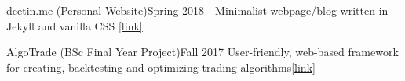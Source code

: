 \documentclass[main.tex]{subfiles}
\begin{document}
\olb


\olismall
{dcetin.me (Personal Website)}{Spring 2018 -}
{Minimalist webpage/blog written in Jekyll and vanilla CSS}
{\href{http://dcetin.me/}{[link]}}

\olismall
{AlgoTrade (BSc Final Year Project)}{Fall 2017}
{User-friendly, web-based framework for creating, backtesting and optimizing trading algorithms}{\href{https://senior.ceng.metu.edu.tr/2018/algotrading/}{[link]}}

\ole
\end{document}

